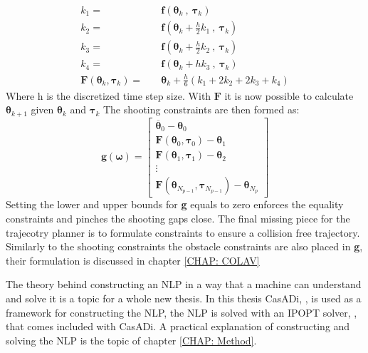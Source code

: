 \begin{equation}
    \label{EQ: RK4}
    \begin{split}
    k_1 = \quad & \textbf{f}(\bm{\theta}_{k} \ , \ \bm{\tau}_k) \\
    k_2 = \quad & \textbf{f}(\bm{\theta}_{k} + \frac{h}{2}k_1 \ , \ \bm{\tau}_k) \\
    k_3 = \quad & \textbf{f}(\bm{\theta}_{k} + \frac{h}{2}k_2 \ , \ \bm{\tau}_k) \\ 
    k_4 = \quad & \textbf{f}(\bm{\theta}_{k} + h k_3 \ , \ \bm{\tau}_k) \\ 
    \textbf{F}(\bm{\theta}_{k}, \bm{\tau}_k) = \quad & \bm{\theta}_k + \frac{h}{6} (k_1 + 2k_2 + 2k_3 + k_4)
    \end{split}
\end{equation}
Where h is the discretized time step size. With $\textbf{F}$ it is now possible to calculate $\bm{\theta}_{k+1}$ given $\bm{\theta}_k$ and $\bm{\tau}_k$
The shooting constraints are then formed as:
\begin{equation}
    \textbf{g}(\bm{\omega}) = \begin{bmatrix}
                            \overline{\bm{\theta}}_0 - \bm{\theta}_0 \\[-5pt]
                            \textbf{F}(\bm{\theta}_{0}, \bm{\tau}_0) - \bm{\theta}_1 \\[-5pt]
                            \textbf{F}(\bm{\theta}_{1}, \bm{\tau}_1) - \bm{\theta}_2 \\[-5pt]
                            \vdots \\[-5pt]
                            \textbf{F}(\bm{\theta}_{N_{p-1}}, \bm{\tau}_{N_{p-1}}) - \bm{\theta}_{N_{p}}
                             \end{bmatrix}
\end{equation}
Setting the lower and upper bounds for \textbf{g} equals to zero enforces the equality constraints and pinches the shooting gaps close. The final missing piece for the trajecotry planner
is to formulate constraints to ensure a collision free trajectory. Similarly to the shooting constraints the obstacle constraints are also placed in \textbf{g}, their
formulation is discussed in chapter \ref{CHAP: COLAV}

The theory behind constructing an \gls{NLP} in a way that a machine can understand and solve it is a topic for a whole new thesis. In this thesis CasADi, \cite{andersson2019casadi}, is used
as a framework for constructing the NLP, the NLP is solved with an \gls{IPOPT} solver, \cite{wachter2006implementation}, that comes included with CasADi. A practical
explanation of constructing and solving the NLP is the topic of chapter \ref{CHAP: Method}.

